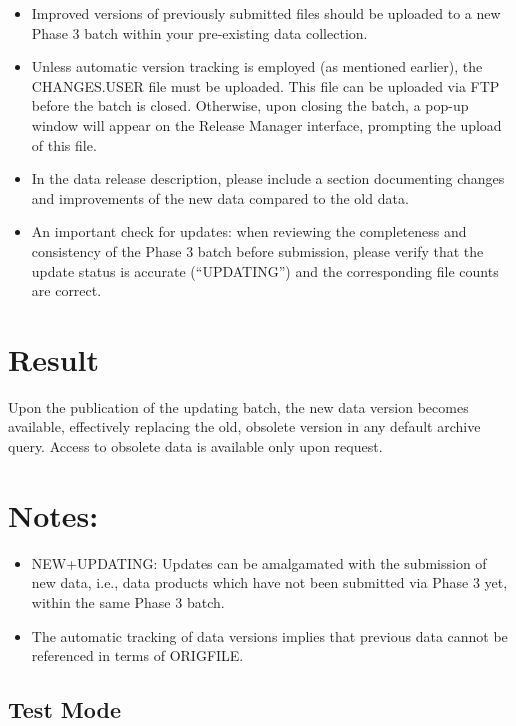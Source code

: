 \documentclass[a4paper,10pt]{book}
\begin{document}
\begin{itemize}
    \item Improved versions of previously submitted files should be uploaded to a new Phase 3 batch within your pre-existing data collection.
    \item Unless automatic version tracking is employed (as mentioned earlier), the CHANGES.USER file must be uploaded. This file can be uploaded via FTP before the batch is closed. Otherwise, upon closing the batch, a pop-up window will appear on the Release Manager interface, prompting the upload of this file.
    \item In the data release description, please include a section documenting changes and improvements of the new data compared to the old data.
    \item An important check for updates: when reviewing the completeness and consistency of the Phase 3 batch before submission, please verify that the update status is accurate (“UPDATING”) and the corresponding file counts are correct.
\end{itemize}

\section{Result}

Upon the publication of the updating batch, the new data version becomes available, effectively replacing the old, obsolete version in any default archive query. Access to obsolete data is available only upon request.

\section{Notes:}

\begin{itemize}
    \item NEW+UPDATING: Updates can be amalgamated with the submission of new data, i.e., data products which have not been submitted via Phase 3 yet, within the same Phase 3 batch.
    \item The automatic tracking of data versions implies that previous data cannot be referenced in terms of ORIGFILE.
\end{itemize}


\subsection{Test Mode}
\end{document}
